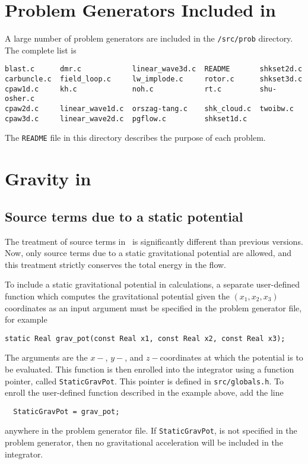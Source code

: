 \section{Problem Generators Included in \ath}

A large number of problem generators are included in the {\tt /src/prob}
directory.  The complete list is
\begin{verbatim}
blast.c      dmr.c            linear_wave3d.c  README       shkset2d.c
carbuncle.c  field_loop.c     lw_implode.c     rotor.c      shkset3d.c
cpaw1d.c     kh.c             noh.c            rt.c         shu-osher.c
cpaw2d.c     linear_wave1d.c  orszag-tang.c    shk_cloud.c  twoibw.c
cpaw3d.c     linear_wave2d.c  pgflow.c         shkset1d.c
\end{verbatim}
The {\tt README} file in this directory describes the purpose of each
problem.

\section{Gravity in \ath}

\subsection{Source terms due to a static potential}

The treatment of source terms in \ath\ is significantly different than
previous versions.  Now, only source terms due to a static gravitational
potential are allowed, and this treatment strictly conserves the total
energy in the flow.

To include a static gravitational potential in calculations, a
separate user-defined function which computes the gravitational potential
given the $(x_{1}, x_{2}, x_{3})$ coordinates as an input argument
must be specified in the problem generator file,
for example
\begin{verbatim}
static Real grav_pot(const Real x1, const Real x2, const Real x3);
\end{verbatim}
The arguments are the $x-$, $y-$, and $z-$coordinates
at which the potential is to be evaluated.  This function is then enrolled
into the integrator using a function pointer, called {\tt StaticGravPot}.
This pointer is defined in
{\tt src/globals.h}.  To enroll the user-defined function described in the
example above, add the line
\begin{verbatim}
  StaticGravPot = grav_pot;
\end{verbatim}
anywhere in the problem generator file.  If {\tt StaticGravPot},
is not specified in the problem
generator, then no gravitational acceleration will be included in the
integrator.

